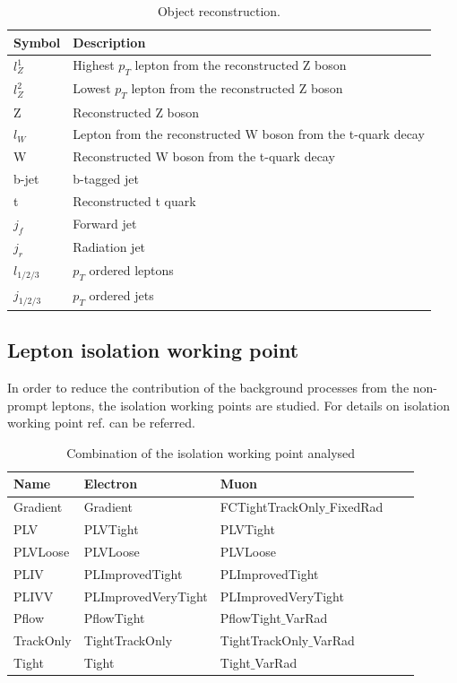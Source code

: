\begin{table}[h!]
\centering
 \begin{tabular}{@{} *2l @{}}
 \toprule
 Symbol & Description   \\ [0.5ex] 
 \hline\hline 
  $l^{1}_{Z}$ & Highest $p_{T}$ lepton from the reconstructed Z boson \\ [0.5ex] 
  $l^{2}_{Z}$ & Lowest $p_{T}$ lepton from the reconstructed Z boson \\ [0.5ex] 
  Z & Reconstructed Z boson \\ [0.5ex]
  $l_{W}$ & Lepton from the reconstructed W boson from the t-quark decay \\ [0.5ex]
  W & Reconstructed W boson from the t-quark decay \\ [0.5ex]
 b-jet & b-tagged jet \\ [0.5ex]
 t & Reconstructed t quark \\ [0.5ex]
 $j_{f}$ & Forward jet  \\ [0.5ex]
 $j_{r}$ & Radiation jet \\ [0.5ex]
 \hline
$l_{1/2/3}$ & $p_{T}$ ordered leptons \\ [0.5ex]
$j_{1/2/3}$ & $p_{T}$ ordered jets \\ [0.8ex]
 \bottomrule
 \end{tabular}
 \caption{Object reconstruction.}
 \label{tab:reco}
\end{table}



\subsection{Lepton isolation working point}
\label{subsec:LWP}

In order to reduce the contribution of the background processes from the non-prompt leptons, the isolation working points are studied. For details on isolation working point ref. \cite{isolationwp:2010n} can be referred. 
\begin{table}[h!]
\centering
 \begin{tabular}{@{} *5l @{}}
 \toprule
 Name & Electron & Muon  \\ [0.5ex] 
 \hline\hline
 Gradient & Gradient & FCTightTrackOnly$\_$FixedRad  \\ 
 PLV & PLVTight & PLVTight  \\
 PLVLoose & PLVLoose & PLVLoose \\
 PLIV & PLImprovedTight & PLImprovedTight  \\
 PLIVV & PLImprovedVeryTight & PLImprovedVeryTight  \\
 Pflow & PflowTight & PflowTight$\_$VarRad  \\
 TrackOnly & TightTrackOnly &  TightTrackOnly$\_$VarRad \\
 Tight & Tight & Tight$\_$VarRad  \\ [1ex] 
 \bottomrule
 \end{tabular}
 \caption{Combination of the isolation working point analysed}
 \label{tab:lep_wp}
\end{table}

